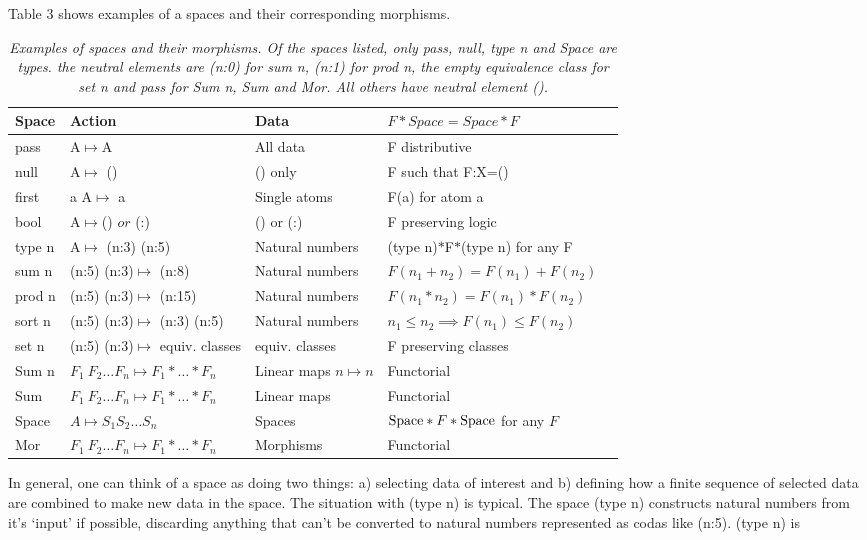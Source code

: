 \documentclass[11pt]{article}
\begin{document}
Table 3 shows examples of a spaces and their corresponding morphisms.  
\begin{table}
\begin{tabular}{| l | l | l | l | l |  }
Space & Action & Data &  $F*Space=Space*F$ \\
\hline 
pass & A$\mapsto$A & All data & F distributive \\
null & A$\mapsto$ () & () only & F such that F:X=() \\
first & a A$\mapsto$ a & Single atoms &  F(a) for atom a \\ 
bool & A$\mapsto$() $or$ (:) & () or (:) &  F preserving logic \\
type n & A$\mapsto$ (n:3) (n:5) & Natural numbers &  (type n)$*$F$*$(type n) for any F \\
sum n & (n:5) (n:3)$\mapsto$ (n:8) & Natural numbers &  $F(n_1+n_2)=F(n_1)+F(n_2)$ \\
prod n & (n:5) (n:3)$\mapsto$ (n:15) & Natural numbers &  $F(n_1*n_2)=F(n_1)*F(n_2)$ \\
sort n & (n:5) (n:3)$\mapsto$ (n:3) (n:5) & Natural numbers & $n_1\le n_2 \implies F(n_1)\le F(n_2)$ \\
set n & (n:5) (n:3)$\mapsto$ equiv. classes & equiv. classes & F preserving classes \\
Sum n & $F_1\ F_2\dots F_n\mapsto F_1*\dots *F_n$ & Linear maps $n\mapsto n$ & Functorial \\
Sum & $F_1\ F_2\dots F_n\mapsto F_1*\dots *F_n$ & Linear maps  & Functorial \\
Space & $A\mapsto S_1 S_2\dots S_n$ & Spaces & ${\rm Space}*F*{\rm Space}$ for any $F$\\
Mor & $F_1\ F_2\dots F_n\mapsto F_1*\dots *F_n$ & Morphisms & Functorial \\
\hline
\end{tabular} 
\caption{{\it Examples of spaces and their morphisms.  Of the spaces listed, only pass, null, type n and Space are types. 
the neutral elements are (n:0) for sum n, (n:1) for prod n, the empty equivalence class for set n and pass for Sum n, Sum and Mor.  All others have neutral element ().}}   
\end{table}
In general, one can think of a space as doing two things:  a) selecting data of interest and b) defining how 
a finite sequence of selected data are combined to make new data in the space.  
The situation with (type n) is typical.  The space (type n) constructs natural numbers from it's `input' if possible, 
discarding anything that can't be converted to natural numbers represented as codas like (n:5).  (type n) is 
\end{document}
